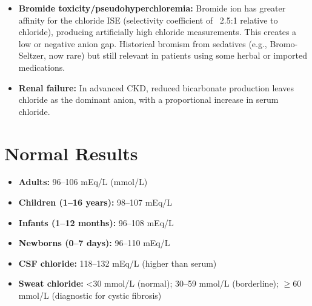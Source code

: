 \begin{itemize}
  \item \textbf{Bromide toxicity/pseudohyperchloremia:} Bromide ion has greater affinity for the chloride ISE (selectivity coefficient of ~2.5:1 relative to chloride), producing artificially high chloride measurements. This creates a low or negative anion gap. Historical bromism from sedatives (e.g., Bromo-Seltzer, now rare) but still relevant in patients using some herbal or imported medications.
  \item \textbf{Renal failure:} In advanced CKD, reduced bicarbonate production leaves chloride as the dominant anion, with a proportional increase in serum chloride.
\end{itemize}

\section*{Normal Results}
\begin{itemize}
  \item \textbf{Adults:} 96--106 mEq/L (mmol/L)
  \item \textbf{Children (1--16 years):} 98--107 mEq/L
  \item \textbf{Infants (1--12 months):} 96--108 mEq/L
  \item \textbf{Newborns (0--7 days):} 96--110 mEq/L
  \item \textbf{CSF chloride:} 118--132 mEq/L (higher than serum)
  \item \textbf{Sweat chloride:} <30 mmol/L (normal); 30--59 mmol/L (borderline); $\geq$60 mmol/L (diagnostic for cystic fibrosis)
\end{itemize}

